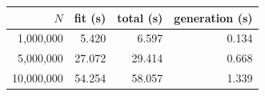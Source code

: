 \begin{tabular}{rrrr}
\toprule
$N$ & fit (s) & total (s) & generation (s)\\
\midrule
1,000,000 & 5.420 & 6.597 & 0.134\\
5,000,000 & 27.072 & 29.414 & 0.668\\
10,000,000 & 54.254 & 58.057 & 1.339\\
\bottomrule
\end{tabular}
